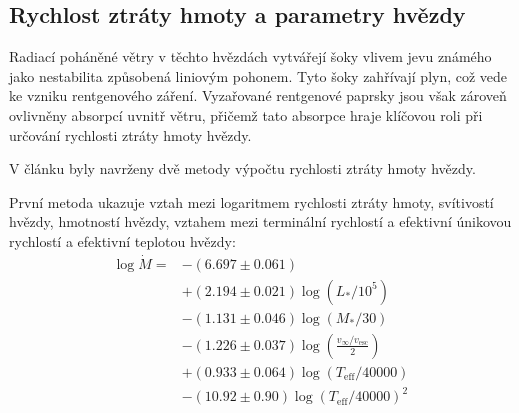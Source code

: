 \documentclass[a4paper,11pt]{article}
\begin{document}
\begin{minipage}[t]{0.5\textwidth}
            \subsection{Rychlost ztráty hmoty a parametry hvězdy}
                Radiací poháněné větry v těchto hvězdách vytvářejí šoky vlivem jevu známého jako nestabilita způsobená liniovým pohonem. Tyto šoky zahřívají plyn, což vede ke vzniku rentgenového záření. Vyzařované rentgenové paprsky jsou však zároveň ovlivněny absorpcí uvnitř větru, přičemž tato absorpce hraje klíčovou roli při určování rychlosti ztráty hmoty hvězdy.
                \par V článku \cite{2000A&A...362..295V} byly navrženy dvě metody výpočtu rychlosti ztráty hmoty hvězdy. 
                \par První metoda ukazuje vztah mezi logaritmem rychlosti ztráty hmoty, svítivostí hvězdy, hmotností hvězdy, vztahem mezi terminální rychlostí a efektivní únikovou rychlostí a efektivní teplotou hvězdy: 
                \begin{equation}
                    \begin{aligned}
                        \log \dot{M} = & - (6.697 \pm 0.061) \\
                        & + (2.194 \pm 0.021) \log (L_*/10^5) \\
                        & - (1.131 \pm 0.046) \log (M_*/30) \\
                        & - (1.226 \pm 0.037) \log \left(\frac{v_{\infty}/v_{\text{esc}}}{2}\right) \\
                        & + (0.933 \pm 0.064) \log (T_{\text{eff}}/40000) \\
                        & - (10.92 \pm 0.90) \log (T_{\text{eff}}/40000)^2
                    \end{aligned}
                \end{equation}
    \end{minipage}
    \hspace{10pt}
\end{document}
